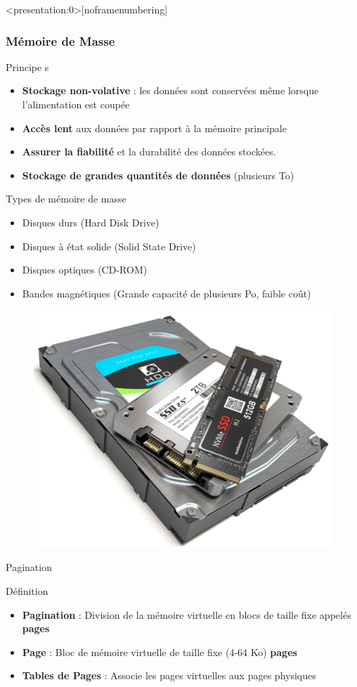 \documentclass[8pt]{beamer}
\begin{document}
\begin{frame}<presentation:0>[noframenumbering]
    \frametitle{Mémoire de Masse}
    \begin{block}{Principe s}
        \begin{itemize}
            \item \textbf{Stockage non-volative} : les données sont conservées
                  même lorsque l'alimentation est coupée
            \item \textbf{Accès lent} aux données par rapport à la mémoire
                  principale
            \item \textbf{Assurer la fiabilité} et la durabilité des données
                  stockées.
            \item \textbf{Stockage de grandes quantités de données} (plusieurs
                  To)

        \end{itemize}
    \end{block}
    \begin{exampleblock}{Types de mémoire de masse}
        \begin{itemize}
            \item Disques durs (Hard Disk Drive)
            \item Disques à état solide (Solid State Drive)
            \item Disques optiques (CD-ROM)
            \item Bandes magnétiques (Grande capacité de plusieurs Po, faible
                  coût)
        \end{itemize}
    \end{exampleblock}
    \begin{figure}
        \centering
        \includegraphics[width=.25\textwidth]{figures/HDD+SSD.png}
    \end{figure}
\end{frame}

\begin{frame}{Pagination}
    \begin{block}{D\'efinition}
        \begin{itemize}
            \item \textbf{Pagination} : Division de la mémoire virtuelle en
                  blocs de taille fixe appelés \textbf{pages}
            \item \textbf{Page} : Bloc de mémoire virtuelle de taille fixe
                  (4-64 Ko)
                  \textbf{pages}
            \item \textbf{Tables de Pages} : Associe les pages
                  virtuelles aux pages physiques
        \end{itemize}
    \end{block}
\end{frame}
\end{document}

